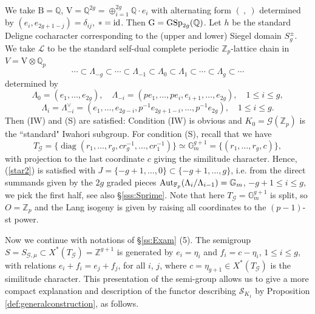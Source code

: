 \documentclass[reqno, 10pt]{amsart}
\newcommand{\BF}{\ensuremath{\mathbb {F}}\xspace}
\newcommand{\BG}{\ensuremath{\mathbb {G}}\xspace}
\newcommand{\BQ}{\ensuremath{\mathbb {Q}}\xspace}
\newcommand{\BZ}{\ensuremath{\mathbb {Z}}\xspace}
\newcommand{\CG}{\ensuremath{\mathcal {G}}\xspace}
\newcommand{\CS}{\ensuremath{\mathcal {S}}\xspace}
\newcommand{\RB}{\ensuremath{\mathrm {B}}\xspace}
\newcommand{\RG}{\ensuremath{\mathrm {G}}\xspace}
\newcommand{\RV}{\ensuremath{\mathrm {V}}\xspace}
\DeclareMathOperator{\diag}{diag}
\theoremstyle{definition}
\numberwithin{equation}{subsection}
\numberwithin{subsubsection}{subsection}
\begin{document}
  We take $\RB=\BQ$, $\RV=\BQ^{2g}=\oplus_{i=1}^{2g}\BQ\cdot e_i$ with alternating form $(\ ,\ )$ determined by $(e_i, e_{2g+1-j})=\delta_{ij}$, $*={\rm id}$. Then $\RG={\rm GSp}_{2g}(\BQ)$. Let $h$ be the standard Deligne cocharacter corresponding to the (upper and lower) Siegel domain $S_g^{\pm}$.  We take $\mathscr L$ to be the standard self-dual {\rm complete} periodic $\BZ_p$-lattice chain in $V=\RV\otimes\BQ_p$ 
  \[
\cdots \subset \Lambda_{-g}\subset\cdots \subset \Lambda_{-1}\subset  \Lambda_0\subset \Lambda_1\subset\cdots\subset \Lambda_g\subset\cdots
  \]
  determined by
  \[
  \Lambda_0=(e_1,\ldots, e_{2g}),\quad 
  \Lambda_{-i}=(pe_1,\ldots, pe_i, e_{i+1},\ldots, e_{2g}),\quad 1\leq i\leq g,
  \]
  \[
 \Lambda_{i} =\Lambda_{-i}^\vee =(e_1,\ldots, e_{2g-i}, p^{-1}e_{2g+1-i},\ldots,  p^{-1}e_{2g}), \quad 1\leq i\leq g.
  \]
   Then (IW) and (S) are satisfied: Condition (IW) is obvious and $K_0=\CG(\BZ_p)$ is the ``standard" Iwahori subgroup. 
   For   condition (S), recall that we have
   \[
   T_\CG=\{\diag(r_1,\ldots, r_g, cr_g^{-1},\ldots, cr^{-1}_1)\}\simeq \BG_m^{g+1}=\{(r_1,\ldots, r_g, c)\},
   \]
   with projection to the last coordinate $c$ giving the similitude character.
   Hence, (\ref{star2}) is satisfied with $J=\{-g+1,\ldots, 0\}\subset \{-g+1,\ldots, g\}$, i.e. from the direct summands given by the $2g$ graded pieces ${\rm Aut}_{\BF_p}(\Lambda_i/\Lambda_{i-1})=\BG_m$, $-g+1\leq i\leq g$, we pick the first half, see also \S \ref{sss:Sprime}. Note that here $T_\CG=\BG_m^{g+1}$ is split, so $O=\BZ_p$ and the Lang isogeny is given by raising all coordinates to the $(p-1)$-st power.

   
  Now we continue with notations of \S \ref{ss:Exam} (5). The semigroup $S=S_{\CG,\mu}\subset X^*(T_\CG)=\BZ^{g+1}$ is generated by $e_i=\eta_i$ and $f_i=c-\eta_i$, $1\leq i\leq g$, with relations $e_i+f_i=e_j+f_j$, for all $i$, $j$, where $c=\eta_{g+1}\in X^*(T_\CG)$ is the similitude character.
 This presentation of the semi-group allows us to give a more compact explanation and description of the functor describing $\CS_{K_1}$ by Proposition \ref{def:generalconstruction}, as follows.
 
\end{document}
